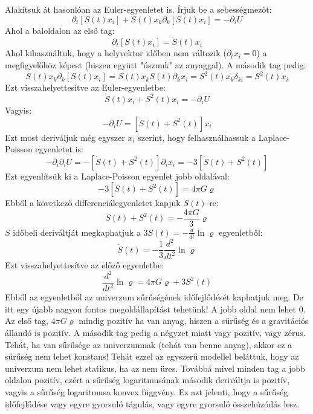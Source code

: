 \documentclass[../main.tex]{subfiles}
\begin{document}
Alakítsuk át hasonlóan az Euler-egyenletet is. Írjuk be a sebességmezőt:
\begin{equation}
    \partial_t [S(t) x_i] + S(t) x_k \partial_k [S(t) x_i] = - \partial_i U
\end{equation}
Ahol a baloldalon az első tag:
\begin{equation}
    \partial_t [S(t) x_i] = \dot{S}(t) x_i
\end{equation}
Ahol kihasználtuk, hogy a helyvektor időben nem változik ($\partial_t x_i = 0$) a megfigyelőhöz képest (hiszen együtt "úszunk" az anyaggal).
A második tag pedig:
\begin{equation}
    S(t) x_k \partial_k [S(t) x_i] = S(t) x_k S(t) \partial_k x_i = S^2(t) x_k \delta_{ki} = S^2(t) x_i
\end{equation}
Ezt visszahelyettesítve az Euler-egyenletbe:
\begin{equation}
    \dot{S}(t) x_i + S^2(t) x_i = - \partial_i U
\end{equation}
Vagyis:
\begin{equation}
    - \partial_i U = [\dot{S}(t) + S^2(t)] x_i
\end{equation}
Ezt most deriváljuk még egyszer $x_i$ szerint, hogy felhasználhassuk a Laplace-Poisson egyenletet is:
\begin{equation}
    - \partial_i \partial_i U = - [\dot{S}(t) + S^2(t)] \partial_i x_i = - 3 [\dot{S}(t) + S^2(t)]
\end{equation}
Ezt egyenlítsük ki a Laplace-Poisson egyenlet jobb oldalával:
\begin{equation}
    - 3 [\dot{S}(t) + S^2(t)] = 4 \pi G \varrho
\end{equation}
Ebből a következő differenciálegyenletet kapjuk $S(t)$-re:
\begin{equation}
    \dot{S}(t) + S^2(t) = - \frac{4 \pi G}{3} \varrho
\end{equation}
$S$ időbeli deriváltját megkaphatjuk a $3S(t) = - \frac{d}{d t} \ln \varrho$ egyenletből:
\begin{equation}
    \dot{S}(t) = - \frac{1}{3} \frac{d^2}{d t^2} \ln \varrho
\end{equation}
Ezt visszahelyettesítve az előző egyenletbe:
\begin{equation}
    \frac{d^2}{dt^2} \ln \varrho = 4 \pi G \varrho + 3 S^2(t)
\end{equation}
Ebből az egyenletből az univerzum sűrűségének időfejlődését kaphatjuk meg. De itt egy újabb nagyon fontos megoldállapítást tehetünk! A jobb oldal nem lehet 0. 
Az első tag, $4 \pi G \varrho$ mindig pozitív ha van anyag, hiszen a sűrűség és a gravitációs állandó is pozitív. A második tag pedig a négyzet miatt vagy pozitív, vagy zérus.
Tehát, ha van sűrűsége az univerzumnak (tehát van benne anyag), akkor ez a sűrűség nem lehet konstans! Tehát ezzel az egyszerű modellel beláttuk, hogy az univerzum nem lehet statikus, ha az nem üres.
Továbbá mivel minden tag a jobb oldalon pozitív, ezért a sűrűség logaritmusának második deriváltja is pozitív, vagyis a sűrűség logaritmusa konvex függvény. Ez azt jelenti, hogy a sűrűség időfejlődése
vagy egyre gyorsuló tágulás, vagy egyre gyorsuló összehúzódás lesz.
\end{document}
